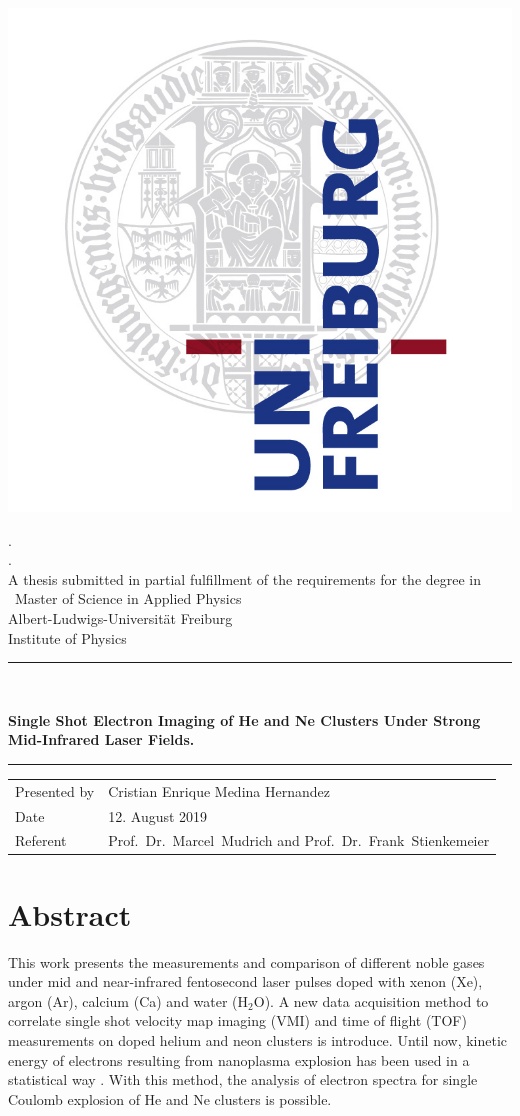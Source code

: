 \documentclass[a4paper,12pt,bibtotocnumbered, twosite]{scrreprt}
\newcommand{\titel}{Single Shot Electron Imaging of He and Ne Clusters Under Strong Mid-Infrared Laser Fields.}
\newcommand{\welchethesis}{Master of Science in Applied Physics}
\newcommand{\thesisofwas}{A thesis submitted in partial fulfillment of the
requirements for the degree in }
\newcommand{\welchesInstitute}{Institute of Physics}
\newcommand{\welcheUni}{Albert-Ludwigs-Universität Freiburg}
\newcommand{\autor}{Cristian Enrique Medina Hernandez}
\newcommand{\datee}{12. August 2019} %
\newcommand{\referent}{ Prof.\ Dr.\ Marcel\ Mudrich and Prof.\ Dr.\ Frank\ Stienkemeier  }
\begin{document}
\begin{titlepage}
\centering
\includegraphics[width=7 cm]{logo}

\begin{center}    
    {\LARGE .} \\[0.5cm]
    {\large .} \\[5mm]
    {\large  \thesisofwas\ \welchethesis} \\ \welcheUni \\ \welchesInstitute  \\[5mm]
    \rule{\textwidth}{2pt}\\[0.5cm] 
    {\begin{spacing}{1.15} \huge \bfseries \titel \\
    \end{spacing}}
    \rule{\textwidth}{2pt}    
    \vfill 
 
     



    \begin{tabular}{ll} 
      Presented by & \autor \\
      Date & \datee \\
      Referent & \referent \\
    \end{tabular}  

\end{center}
    
\end{titlepage}


\chapter*{Abstract}

This work presents the measurements and comparison of different noble gases under mid and near-infrared fentosecond laser pulses doped with xenon (Xe), argon (Ar), calcium (Ca) and water (H$_{2}$O). A new data acquisition method to correlate single shot velocity map imaging (VMI) and time of flight (TOF) measurements on doped helium and neon clusters is introduce. Until now, kinetic energy of electrons resulting from nanoplasma explosion has been used in a statistical way \cite{stienkemeier_spectroscopy_2006}\cite{kelbg_comparison_2018}\cite{kelbg_auger_2019}\cite{kelbg_auger_2019}. With this method, the analysis of electron spectra for single Coulomb explosion of He and Ne clusters is possible.
\end{document}
